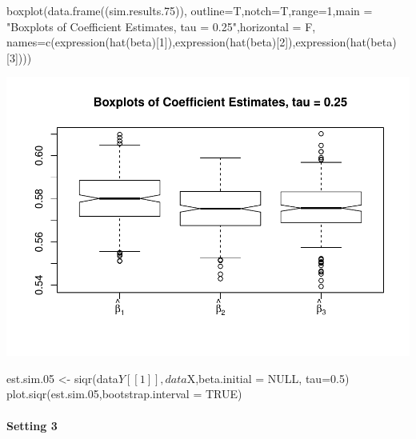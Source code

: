 \begin{Schunk}
\begin{Sinput}
boxplot(data.frame((sim.results.75)), outline=T,notch=T,range=1,main = "Boxplots of Coefficient Estimates, tau = 0.25",horizontal = F,
names=c(expression(hat(beta)[1]),expression(hat(beta)[2]),expression(hat(beta)[3])))
\end{Sinput}

\includegraphics{siqr_files/figure-latex/unnamed-chunk-9-1} \end{Schunk}

\begin{Schunk}
\begin{Sinput}
est.sim.05 <- siqr(data$Y[[1]],data$X,beta.initial = NULL, tau=0.5)
plot.siqr(est.sim.05,bootstrap.interval = TRUE)
\end{Sinput}
\end{Schunk}

\hypertarget{setting-3}{%
\paragraph{Setting 3}\label{setting-3}}

\begin{Schunk}
\end{Schunk}

